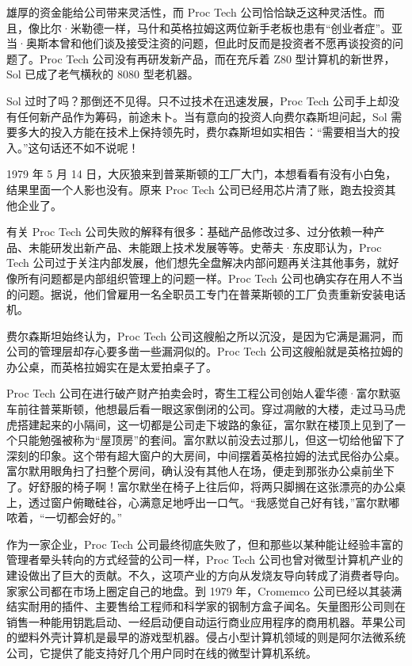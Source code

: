 \documentclass[12pt,UTF8]{ctexbook}
\begin{document}
雄厚的资金能给公司带来灵活性，而 Proc Tech 公司恰恰缺乏这种灵活性。而且，像比尔·米勒德一样，马什和英格拉姆这两位新手老板也患有“创业者症”。亚当·奥斯本曾和他们谈及接受注资的问题，但此时反而是投资者不愿再谈投资的问题了。Proc Tech 公司没有再研发新产品，而在充斥着 Z80 型计算机的新世界，Sol 已成了老气横秋的 8080 型老机器。

Sol 过时了吗？那倒还不见得。只不过技术在迅速发展，Proc Tech 公司手上却没有任何新产品作为筹码，前途未卜。当有意向的投资人向费尔森斯坦问起，Sol 需要多大的投入方能在技术上保持领先时，费尔森斯坦如实相告：“需要相当大的投入。”这句话还不如不说呢！

1979 年 5 月 14 日，大灰狼来到普莱斯顿的工厂大门，本想看看有没有小白兔，结果里面一个人影也没有。原来 Proc Tech 公司已经用芯片清了账，跑去投资其他企业了。

有关 Proc Tech 公司失败的解释有很多：基础产品修改过多、过分依赖一种产品、未能研发出新产品、未能跟上技术发展等等。史蒂夫·东皮耶认为，Proc Tech 公司过于关注内部发展，他们想先全盘解决内部问题再关注其他事务，就好像所有问题都是内部组织管理上的问题一样。Proc Tech 公司也确实存在用人不当的问题。据说，他们曾雇用一名全职员工专门在普莱斯顿的工厂负责重新安装电话机。

费尔森斯坦始终认为，Proc Tech 公司这艘船之所以沉没，是因为它满是漏洞，而公司的管理层却存心要多凿一些漏洞似的。Proc Tech 公司这艘船就是英格拉姆的办公桌，而英格拉姆实在是太爱拍桌子了。

Proc Tech 公司在进行破产财产拍卖会时，寄生工程公司创始人霍华德·富尔默驱车前往普莱斯顿，他想最后看一眼这家倒闭的公司。穿过凋敝的大楼，走过马马虎虎搭建起来的小隔间，这一切都是公司走下坡路的象征，富尔默在楼顶上见到了一个只能勉强被称为“屋顶房”的套间。富尔默以前没去过那儿，但这一切给他留下了深刻的印象。这个带有超大窗户的大房间，中间摆着英格拉姆的法式民俗办公桌。富尔默用眼角扫了扫整个房间，确认没有其他人在场，便走到那张办公桌前坐下了。好舒服的椅子啊！富尔默坐在椅子上往后仰，将两只脚搁在这张漂亮的办公桌上，透过窗户俯瞰硅谷，心满意足地呼出一口气。“我感觉自己好有钱，”富尔默嘟哝着，“一切都会好的。”

作为一家企业，Proc Tech 公司最终彻底失败了，但和那些以某种能让经验丰富的管理者晕头转向的方式经营的公司一样，Proc Tech 公司也曾对微型计算机产业的建设做出了巨大的贡献。不久，这项产业的方向从发烧友导向转成了消费者导向。家家公司都在市场上圈定自己的地盘。到 1979 年，Cromemco 公司已经以其装满结实耐用的插件、主要售给工程师和科学家的钢制方盒子闻名。矢量图形公司则在销售一种能用钥匙启动、一经启动便自动运行商业应用程序的商用机器。苹果公司的塑料外壳计算机是最早的游戏型机器。侵占小型计算机领域的则是阿尔法微系统公司，它提供了能支持好几个用户同时在线的微型计算机系统。
\end{document}
